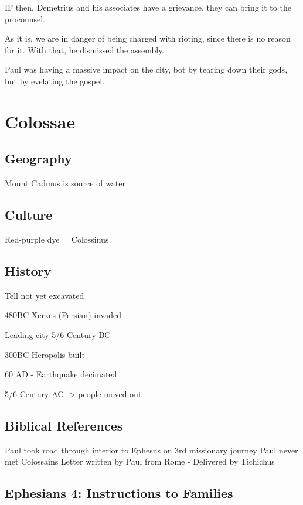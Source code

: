 \documentclass[
]{book}
\begin{document}
IF then, Demetrius and his associates have a grievance, they can bring it to the procounsel.

As it is, we are in danger of being charged with rioting, since there is no reason for it. With that, he dismissed the assembly.

Paul was having a massive impact on the city, bot by tearing down their gods, but by evelating the gospel.

\hypertarget{colossae}{%
\chapter{Colossae}\label{colossae}}

\hypertarget{geography-1}{%
\section{Geography}\label{geography-1}}

Mount Cadmus is source of water

\hypertarget{culture}{%
\section{Culture}\label{culture}}

Red-purple dye = Colossinus

\hypertarget{history-1}{%
\section{History}\label{history-1}}

Tell not yet excavated

480BC Xerxes (Persian) invaded

Leading city 5/6 Century BC

300BC Heropolis built

60 AD - Earthquake decimated

5/6 Century AC -\textgreater{} people moved out

\hypertarget{biblical-references}{%
\section{Biblical References}\label{biblical-references}}

Paul took road through interior to Ephesus on 3rd missionary journey
Paul never met Colossains
Letter written by Paul from Rome - Delivered by Tichichus

\hypertarget{ephesians-4-instructions-to-families}{%
\section{Ephesians 4: Instructions to Families}\label{ephesians-4-instructions-to-families}}
\end{document}
